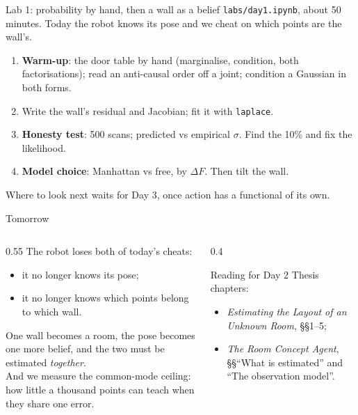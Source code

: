 \documentclass[10pt, aspectratio=169]{beamer}
\begin{document}
\begin{frame}{Lab 1: probability by hand, then a wall as a belief}
  \texttt{labs/day1.ipynb}, about 50 minutes. Today the robot knows its pose and we cheat on which
  points are the wall's.
  \begin{enumerate}\small
    \item \textbf{Warm-up}: the door table by hand (marginalise, condition, both factorisations);
          read an anti-causal order off a joint; condition a Gaussian in both forms.
    \item Write the wall's residual and Jacobian; fit it with \texttt{laplace}.
    \item \textbf{Honesty test}: 500 scans; predicted vs empirical $\sigma$. Find the 10\% and fix
          the likelihood.
    \item \textbf{Model choice}: Manhattan vs free, by $\Delta F$. Then tilt the wall.
  \end{enumerate}
  \vspace{0.4em}
  \small Where to look next waits for Day 3, once action has a functional of its own.
\end{frame}

\begin{frame}{Tomorrow}
  \begin{columns}[c]
    \begin{column}{0.55\textwidth}
      The robot loses both of today's cheats:
      \begin{itemize}
        \item it no longer knows its pose;
        \item it no longer knows which points belong to which wall.
      \end{itemize}
      One wall becomes a room, the pose becomes one more belief, and the two must be estimated
      \emph{together}.\\[0.5em]
      And we measure the common-mode ceiling: how little a thousand points can teach when they
      share one error.
    \end{column}
    \begin{column}{0.4\textwidth}
      \begin{block}{Reading for Day 2}\small
        Thesis chapters:
        \begin{itemize}
          \item \emph{Estimating the Layout of an Unknown Room}, \S\S 1--5;
          \item \emph{The Room Concept Agent}, \S\S ``What is estimated'' and ``The observation
                model''.
        \end{itemize}
      \end{block}
    \end{column}
  \end{columns}
\end{frame}
\end{document}
